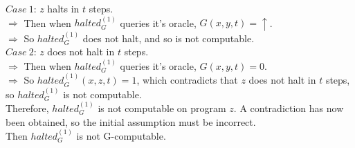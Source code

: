 \documentclass{assignment}
\begin{document}
\begin{problemlist}
\begin{answer}
    $Case~1$: $z$ halts in $t$ steps.\\
    $\Rightarrow$ Then when $halted_G^{(1)}$ queries it's oracle, $G(x,y,t)=\uparrow$.\\
    $\Rightarrow$ So $halted_G^{(1)}$ does not halt, and so is not computable.\\

    $Case~2$: $z$ does not halt in $t$ steps.\\
    $\Rightarrow$ Then when $halted_G^{(1)}$ queries it's oracle, $G(x,y,t)=0$.\\
    $\Rightarrow$ So $halted_G^{(1)}(x,z,t)=1$, which contradicts that $z$ does not halt in $t$ steps, so $halted_G^{(1)}$ is not computable.\\
    
    
    Therefore, $halted_{G}^{(1)}$ is not computable on program $z$. A contradiction has now been obtained, so the initial assumption must be incorrect. \\
    Then $halted_{G}^{(1)}$ is not G-computable.    
    
  \end{answer}

\end{problemlist}
\end{document}
